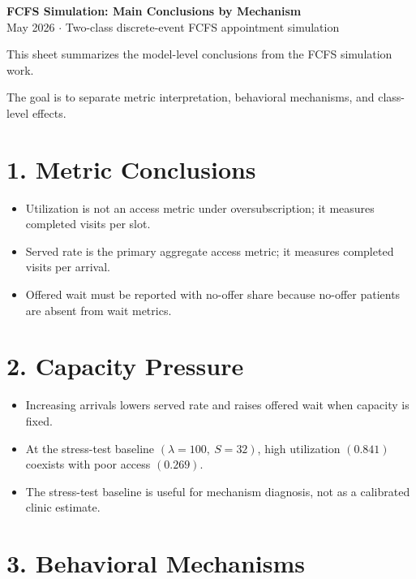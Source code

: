 \documentclass[11pt]{article}
\begin{document}
\begin{center}
  {\LARGE\bfseries FCFS Simulation: Main Conclusions by Mechanism}\\[5pt]
  {\normalsize May 2026 \(\cdot\) Two-class discrete-event FCFS appointment simulation}
\end{center}

\vspace{0.4em}

\begin{infobox}
This sheet summarizes the model-level conclusions from the FCFS simulation work.

The goal is to separate metric interpretation, behavioral mechanisms, and class-level effects.
\end{infobox}

\section*{1. Metric Conclusions}

\begin{itemize}
\item Utilization is not an access metric under oversubscription; it measures completed visits per slot.
\item Served rate is the primary aggregate access metric; it measures completed visits per arrival.
\item Offered wait must be reported with no-offer share because no-offer patients are absent from wait metrics.
\end{itemize}

\section*{2. Capacity Pressure}

\begin{itemize}
\item Increasing arrivals lowers served rate and raises offered wait when capacity is fixed.
\item At the stress-test baseline \((\lambda = 100,\ S = 32)\), high utilization \((0.841)\) coexists with poor access \((0.269)\).
\item The stress-test baseline is useful for mechanism diagnosis, not as a calibrated clinic estimate.
\end{itemize}

\section*{3. Behavioral Mechanisms}
\end{document}
